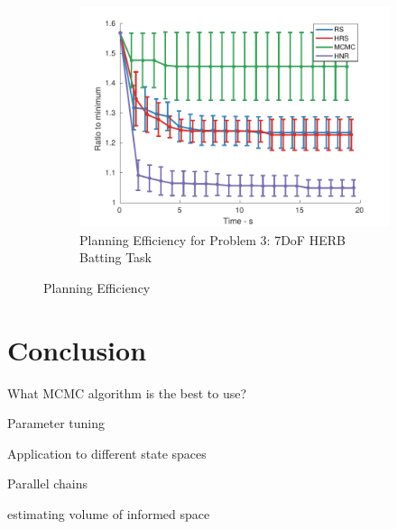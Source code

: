 \documentclass[letterpaper, 10 pt, conference]{ieeeconf}  %
\begin{document}
\begin{figure}[t!]
	\begin{subfigure}[b]{0.5\textwidth}
	\includegraphics[width=\linewidth]{fig/planning_efficiency/herb_batting_efficiency}
	\caption{\captionstyle Planning Efficiency for Problem 3: 7DoF HERB Batting Task}
	\label{fig:planning_efficiency:herb:batting}
    \end{subfigure}
	\caption{Planning Efficiency}
	\label{fig:planning_efficiency}
\end{figure} 

\section{Conclusion}

What MCMC algorithm is the best to use?

Parameter tuning

Application to different state spaces

Parallel chains

estimating volume of informed space







%
\end{document}
